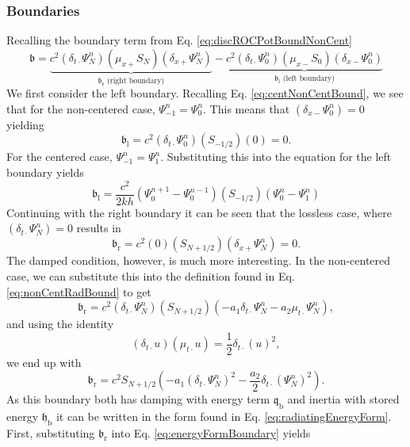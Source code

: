 \documentclass[dvipsnames]{article}
\def\dxp{\delta_{x+}}
\def\dxm{\delta_{x-}}
\def\mup{\mu_{x+}}
\def\mum{\mu_{x-}}
\def\dtd{\delta_{t\cdot}}
\begin{document}
\subsubsection{Boundaries}\label{sec:boundaries}
Recalling the boundary term from Eq. \eqref{eq:discROCPotBoundNonCent} 
\begin{equation}
    \mathfrak{b} = \underbrace{ c^2(\dtd\Psi_N^n)(\mup S_N)(\dxp\Psi_N^n)}_{\mathfrak{b_\text{r}} \text{ (right boundary)}} -\underbrace{c^2(\dtd\Psi_0^n)(\mum S_0)(\dxm \Psi_0^n)}_{\mathfrak{b}_\text{l} \text{ (left boundary)}}
\end{equation}
We first consider the left boundary. Recalling Eq. \eqref{eq:centNonCentBound}, we see that for the non-centered case, $\Psi_{-1}^n = \Psi_0^n$. This means that $(\dxm\Psi_0^n) = 0 $ yielding
\begin{equation}
    \mathfrak{b}_\text{l} = c^2(\dtd\Psi_0^n)(S_{-1/2})(0) = 0.
\end{equation}
For the centered case, $\Psi_{-1}^n = \Psi_1^n$. Substituting this into the equation for the left boundary yields
\begin{equation}
    \mathfrak{b}_\text{l} = \frac{c^2}{2kh}(\Psi_0^{n+1} - \Psi_0^{n-1})(S_{-1/2})(\Psi_0^n - \Psi_1^n)
\end{equation}
Continuing with the right boundary it can be seen that the lossless case, where $(\dtd \Psi_N^n) = 0$ results in 
\begin{equation}
    \mathfrak{b}_\text{r} = c^2(0)(S_{N+1/2})(\dxp\Psi_N^n) = 0.
\end{equation}
The damped condition, however, is much more interesting. In the non-centered case, we can substitute this into the definition found in Eq. \eqref{eq:nonCentRadBound} to get
\begin{equation}
    \mathfrak{b}_\text{r} = c^2(\dtd\Psi_N^n)( S_{N+1/2})(-a_1\dtd\Psi_N^n - a_2\mu_{t\cdot}\Psi_N^n),
    \end{equation}
    and using the identity
    \begin{equation}
    (\dtd u)(\mu_{t\cdot}u) = \frac{1}{2} \dtd(u)^2,
\end{equation}
we end up with
\begin{equation}
    \mathfrak{b}_\text{r} = c^2 S_{N+1/2}\left(-a_1(\dtd\Psi_N^n)^2 - \frac{a_2}{2}\dtd(\Psi_N^n)^2\right).
\end{equation}
As this boundary both has damping with energy term $\mathfrak{q}_\text{b}$ and inertia with stored energy $\mathfrak{h}_\text{b}$ it can be written in the form found in Eq. \eqref{eq:radiatingEnergyForm}. First, substituting $\mathfrak{b}_\text{r}$ into Eq. \eqref{eq:energyFormBoundary} yields %
\end{document}
